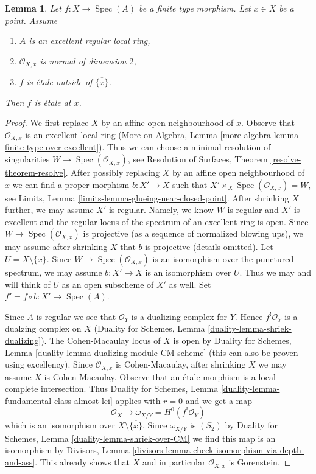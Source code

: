 \documentclass{stacks-project}
\theoremstyle{plain}
\newtheorem{lemma}[subsection]{Lemma}
\theoremstyle{definition}
\theoremstyle{remark}
\numberwithin{equation}{subsection}
\def\Spec{\mathop{\mathrm{Spec}}}
\begin{document}
\begin{lemma}
\label{lemma-key-purity-ramification}
Let $f : X \to \Spec(A)$ be a finite type morphism.
Let $x \in X$ be a point. Assume
\begin{enumerate}
\item $A$ is an excellent regular local ring,
\item $\mathcal{O}_{X, x}$ is normal of dimension $2$,
\item $f$ is \'etale outside of $\overline{\{x\}}$.
\end{enumerate}
Then $f$ is \'etale at $x$.
\end{lemma}

\begin{proof}
We first replace $X$ by an affine open neighbourhood of $x$.
Observe that $\mathcal{O}_{X, x}$ is an excellent local ring
(More on Algebra, Lemma \ref{more-algebra-lemma-finite-type-over-excellent}).
Thus we can choose a minimal resolution of singularities
$W \to \Spec(\mathcal{O}_{X, x})$, see
Resolution of Surfaces, Theorem \ref{resolve-theorem-resolve}.
After possibly replacing $X$ by an affine open neighbourhood of $x$
we can find a proper morphism $b : X' \to X$ such that
$X' \times_X \Spec(\mathcal{O}_{X, x}) = W$, see
Limits, Lemma \ref{limits-lemma-glueing-near-closed-point}.
After shrinking $X$ further, we may assume $X'$ is regular.
Namely, we know $W$ is regular and $X'$ is excellent
and the regular locus of the spectrum of an excellent ring is open.
Since $W \to \Spec(\mathcal{O}_{X, x})$ is projective
(as a sequence of normalized blowing ups), we may assume
after shrinking $X$ that $b$ is projective (details omitted).
Let $U = X \setminus \overline{\{x\}}$.
Since $W \to \Spec(\mathcal{O}_{X, x})$ is an isomorphism over the
punctured spectrum, we may assume $b : X' \to X$ is an isomorphism over $U$.
Thus we may and will think of $U$ as an open subscheme of $X'$ as well.
Set $f' = f \circ b : X' \to \Spec(A)$.

\medskip\noindent
Since $A$ is regular we see that $\mathcal{O}_Y$ is a dualizing complex for $Y$.
Hence $f^!\mathcal{O}_Y$ is a dualzing complex on $X$
(Duality for Schemes, Lemma \ref{duality-lemma-shriek-dualizing}).
The Cohen-Macaulay locus of $X$ is open by
Duality for Schemes, Lemma \ref{duality-lemma-dualizing-module-CM-scheme}
(this can also be proven using excellency).
Since $\mathcal{O}_{X, x}$ is Cohen-Macaulay, after shrinking
$X$ we may assume $X$ is Cohen-Macaulay.
Observe that an \'etale morphism is a local complete intersection.
Thus
Duality for Schemes, Lemma \ref{duality-lemma-fundamental-class-almost-lci}
applies with $r = 0$ and we get a map
$$
\mathcal{O}_X \longrightarrow \omega_{X/Y} = H^0(f^!\mathcal{O}_Y)
$$
which is an isomorphism over $X \setminus \overline{\{x\}}$.
Since $\omega_{X/Y}$ is $(S_2)$ by
Duality for Schemes, Lemma \ref{duality-lemma-shriek-over-CM}
we find this map is an isomorphism by
Divisors, Lemma \ref{divisors-lemma-check-isomorphism-via-depth-and-ass}.
This already shows that $X$ and in particular $\mathcal{O}_{X, x}$ is
Gorenstein.


\end{proof}
\end{document}

